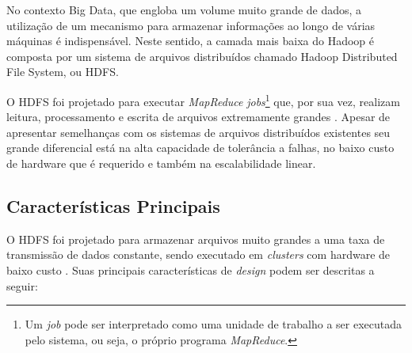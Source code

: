 No contexto Big Data, que engloba um volume muito grande de dados, a utilização de um mecanismo para armazenar informações ao longo de várias máquinas é indispensável. Neste sentido, a camada mais baixa do Hadoop é composta por um sistema de arquivos distribuídos chamado Hadoop Distributed File System, ou HDFS.

O HDFS foi projetado para executar \textit{MapReduce} \textit{jobs}\footnote{Um \textit{job} pode ser interpretado como uma unidade de trabalho a ser executada pelo sistema, ou seja, o próprio programa \textit{MapReduce}.} que, por sua vez, realizam leitura, processamento e escrita de arquivos extremamente grandes \cite{venner2009}. Apesar de apresentar semelhanças com os sistemas de arquivos distribuídos existentes seu grande diferencial está na alta capacidade de tolerância a falhas, no baixo custo de hardware que é requerido e também na escalabilidade linear.

\subsection{Características Principais}

O HDFS foi projetado para armazenar arquivos muito grandes a uma taxa de transmissão de dados constante, sendo executado em \textit{clusters} com hardware de baixo custo \cite{white2012}. Suas principais características de \textit{design} podem ser descritas a seguir:

